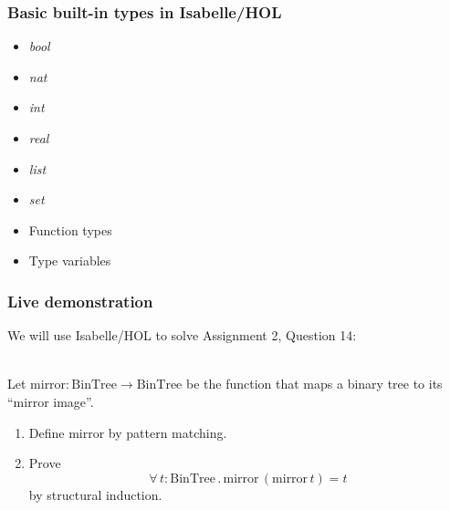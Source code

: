 \documentclass{beamer}
\begin{document}
  \begin{frame}
    \frametitle{Basic built-in types in Isabelle/HOL}
    \begin{itemize}
      \item \textit{bool}
      \item \textit{nat}
      \item \textit{int}
      \item \textit{real}
      \item \textit{list}
      \item \textit{set}
      \item Function types
      \item Type variables
    \end{itemize}
  \end{frame}

  \begin{frame}
    \frametitle{Live demonstration}
    We will use Isabelle/HOL to solve Assignment 2, Question 14:\\~\

    Let $\textrm{mirror} : \textrm{BinTree} \rightarrow
    \textrm{BinTree}$
    be the function that maps a binary tree to its ``mirror image''.

    \begin{enumerate}
      \item Define $\textrm{mirror}$ by pattern matching.

      \item Prove \[\forall\, t : \textrm{BinTree} \mathrel.
      \textrm{mirror}\,(\textrm{mirror}\,t) = t\] by structural
      induction.\\~\

    \end{enumerate}
  \end{frame}
\end{document}
